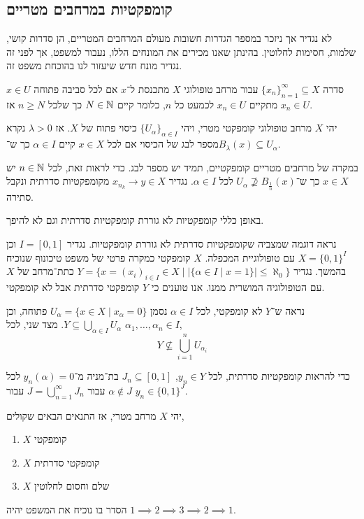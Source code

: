 \subsection{קומפקטיות במרחבים מטריים}
לא נגדיר אך ניזכר במספר הגדרות חשובות מעולם המרחבים המטריים, הן סדרות קושי, שלמות, חסימות לחלוטין.
בהינתן שאנו מכירים את המונחים הללו, נעבור למשפט, אך לפני זה נגדיר מונח חדש שיעזור לנו בהוכחת משפט זה.
\begin{definition}
	סדרה ${\{ x_n \}}_{n = 1}^\infty \subseteq X$ עבור מרחב טופולוגי $X$ מתכנסת ל־$x$ אם לכל סביבה פתוחה $x \in U$ מתקיים $x_n \in U$ לכמעט כל $n$, כלומר קיים $N \in \mathbb{N}$ כך שלכל $n \ge N$ אז $x_n \in U$.
\end{definition}
\begin{definition}
	יהי $X$ מרחב טופולוגי קומפקטי מטרי, ויהי ${\{ U_{\alpha} \}}_{\alpha \in I}$ כיסוי פתוח של $X$.
	אז $\lambda > 0$ נקרא מספר לבג של הכיסוי אם לכל $x \in X$ קיים $\alpha \in I$ כך ש־$B_{\lambda}(x) \subseteq U_{\alpha}$.
\end{definition}
\begin{remark}
	במקרה של מרחבים מטריים קומפקטיים, תמיד יש מספר לבג.
	כדי לראות זאת, לכל $n \in \mathbb{N}$ יש $x \in X$ כך ש־$U_{\alpha} \not\supseteq B_{\frac{1}{n}}(x)$ לכל $\alpha \in I$.
	נגדיר $x_{n_k} \to y \in X$ מקומפקטיות סדרתית ונקבל סתירה.
\end{remark}
\begin{remark}
	באופן כללי קומפקטיות לא גוררת קומפקטיות סדרתית וגם לא להיפך.
\end{remark}
\begin{example}
	נראה דוגמה שמצביה שקומפקטיות סדרתית לא גוררת קומפקטיות.
	נגדיר $I = [0, 1]$ וכן $X = {\{0, 1\}}^I$ עם טופולוגיית המכפלה.
	$X$ קומפקטי כמקרה פרטי של משפט טיכונוף שנוכיח בהמשך.
	נגדיר $Y = \{ x = {(x_i)}_{i \in I} \in X \mid |\{ \alpha \in I \mid x = 1\}| \le \aleph_0 \}$ כתת־מרחב של $X$ עם הטופולוגיה המושרית ממנו.
	אנו טוענים כי $Y$ קומפקטי סדרתית אבל לא קומפקטי.

	נראה ש־$Y$ לא קומפקטי, לכל $\alpha \in I$ נסמן $U_{\alpha} = \{ x \in X \mid x_{\alpha} = 0 \}$ פתוחה, וכן $Y \subseteq \bigcup_{\alpha \in I} U_{\alpha}$.
	מצד שני, לכל $\alpha_1, \ldots, \alpha_n \in I$,
	\[
		Y \not\subseteq \bigcup_{i = 1}^n U_{\alpha_i}
	\]

	כדי להראות קומפקטיות סדרתית, לכל $y_n \in Y$, $J_n \subseteq [0, 1]$ בת־מניה מ־$y_n(\alpha) = 0$ לכל $\alpha \notin J$ עבור $J = \bigcup_{n = 1}^\infty J_n$ עבור $y_n \in {\{0, 1\}}^J$.
\end{example}
\begin{theorem}
	יהי $X$ מרחב מטרי, אז התנאים הבאים שקולים,
	\begin{enumerate}
		\item $X$ קומפקטי
		\item $X$ קומפקטי סדרתית
		\item $X$ שלם וחסום לחלוטין
	\end{enumerate}
\end{theorem}
הסדר בו נוכיח את המשפט יהיה $1 \implies 2 \implies 3 \implies 2 \implies 1$.

